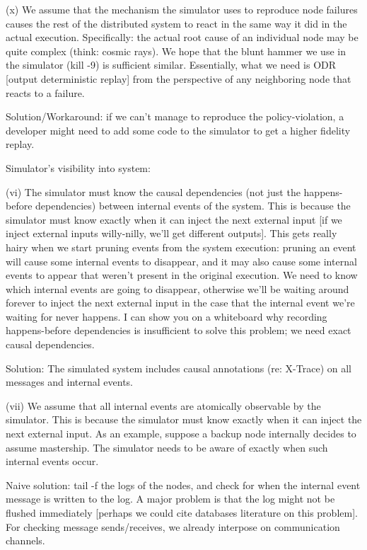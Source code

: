(x) We assume that the mechanism the simulator uses to reproduce node failures causes the rest of the distributed system to react in the same way it did in the actual execution. Specifically: the actual root cause of an individual node may be quite complex (think: cosmic rays). We hope that the blunt hammer we use in the simulator (kill -9) is sufficient similar. Essentially, what we need is ODR [output deterministic replay] from the perspective of any neighboring node that reacts to a failure.

Solution/Workaround: if we can't manage to reproduce the policy-violation, a developer might need to add some code to the simulator to get a higher fidelity replay.

Simulator's visibility into system:

(vi) The simulator must know the causal dependencies (not just the happens-before dependencies) between internal events of the system. This is because the simulator must know exactly when it can inject the next external input [if we inject external inputs willy-nilly, we'll get different outputs]. This gets really hairy when we start pruning events from the system execution: pruning an event will cause some internal events to disappear, and it may also cause some internal events to appear that weren't present in the original execution. We need to know which internal events are going to disappear, otherwise we'll be waiting around forever to inject the next external input in the case that the internal event we're waiting for never happens. I can show you on a whiteboard why recording happens-before dependencies is insufficient to solve this problem; we need exact causal dependencies.

Solution: The simulated system includes causal annotations (re: X-Trace) on all messages and internal events. 

(vii) We assume that all internal events are atomically observable by the simulator. This is because the simulator must know exactly when it can inject the next external input. As an example, suppose a backup node internally decides to assume mastership. The simulator needs to be aware of exactly when such internal events occur.

Naive solution: tail -f the logs of the nodes, and check for when the internal event message is written to the log. A major problem is that the log might not be flushed immediately [perhaps we could cite databases literature on this problem]. For checking message sends/receives, we already interpose on communication channels.

